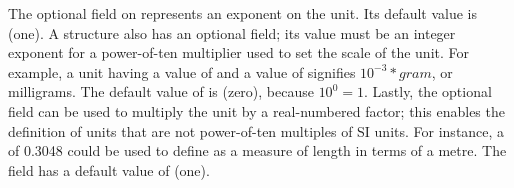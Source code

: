 The optional  field on \Unit represents an
exponent on the unit.  Its default value is  (one).  A
\Unit structure also has an optional  field; its
value must be an integer exponent for a power-of-ten multiplier
used to set the scale of the unit.  For example, a unit having a
 value of  and a  value of
 signifies $10^{-3} * gram$, or milligrams.  The default
value of  is  (zero), because $10^0 = 1$.
Lastly, the optional  field can be used to
multiply the  unit by a real-numbered factor; this
enables the definition of units that are not power-of-ten
multiples of SI units.  For instance, a  of
0.3048 could be used to define  as a measure of length
in terms of a metre.  The  field has a default
value of  (one).

\newcommand{\ynew}{\ensuremath{y}\xspace}
\newcommand{\ybase}{\ensuremath{y_b}\xspace}
\newcommand{\unew}{\ensuremath{\{u\}}\xspace}
\newcommand{\ubase}{\ensuremath{\{u_b\}}\xspace}

